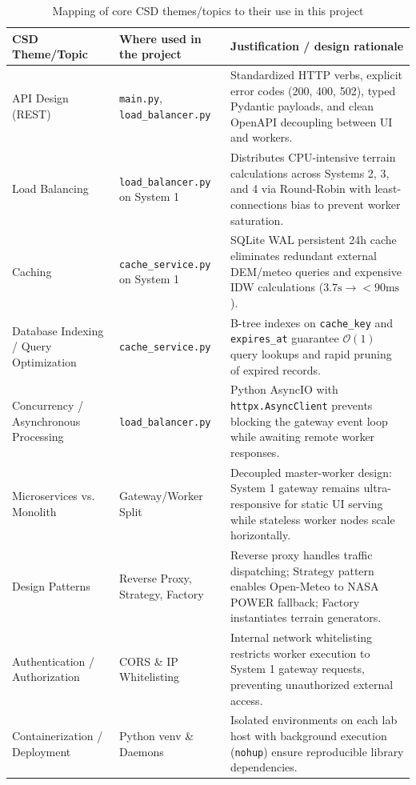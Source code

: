 \documentclass[manuscript,screen,review]{acmart}
\begin{document}
\begin{table}[t]
  \caption{Mapping of core CSD themes/topics to their use in this project}
  \label{tab:csd-themes}
  \small
  \begin{tabular}{p{3.2cm}p{4.6cm}p{7.4cm}}
    \toprule
    CSD Theme/Topic & Where used in the project & Justification / design rationale \\
    \midrule
    API Design (REST) & \texttt{main.py}, \texttt{load\_balancer.py} & Standardized HTTP verbs, explicit error codes (200, 400, 502), typed Pydantic payloads, and clean OpenAPI decoupling between UI and workers. \\
    Load Balancing & \texttt{load\_balancer.py} on System 1 & Distributes CPU-intensive terrain calculations across Systems 2, 3, and 4 via Round-Robin with least-connections bias to prevent worker saturation. \\
    Caching & \texttt{cache\_service.py} on System 1 & SQLite WAL persistent 24h cache eliminates redundant external DEM/meteo queries and expensive IDW calculations ($3.7\text{s} \to <90\text{ms}$). \\
    Database Indexing / Query Optimization & \texttt{cache\_service.py} & B-tree indexes on \texttt{cache\_key} and \texttt{expires\_at} guarantee $\mathcal{O}(1)$ query lookups and rapid pruning of expired records. \\
    Concurrency / Asynchronous Processing & \texttt{load\_balancer.py} & Python AsyncIO with \texttt{httpx.AsyncClient} prevents blocking the gateway event loop while awaiting remote worker responses. \\
    Microservices vs. Monolith & Gateway/Worker Split & Decoupled master-worker design: System 1 gateway remains ultra-responsive for static UI serving while stateless worker nodes scale horizontally. \\
    Design Patterns & Reverse Proxy, Strategy, Factory & Reverse proxy handles traffic dispatching; Strategy pattern enables Open-Meteo to NASA POWER fallback; Factory instantiates terrain generators. \\
    Authentication / Authorization & CORS \& IP Whitelisting & Internal network whitelisting restricts worker execution to System 1 gateway requests, preventing unauthorized external access. \\
    Containerization / Deployment & Python venv \& Daemons & Isolated environments on each lab host with background execution (\texttt{nohup}) ensure reproducible library dependencies. \\

\end{tabular}
\end{table}
\end{document}
